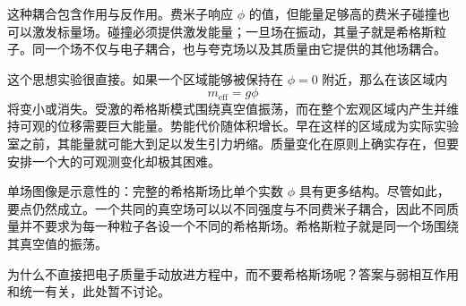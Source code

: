 这种耦合包含作用与反作用。费米子响应 \(\phi\) 的值，但能量足够高的费米子碰撞也可以激发标量场。碰撞必须提供激发能量；一旦场在振动，其量子就是希格斯粒子。同一个场不仅与电子耦合，也与夸克场以及其质量由它提供的其他场耦合。

\begin{classroomqa}
\end{classroomqa}

这个思想实验很直接。如果一个区域能够被保持在 \(\phi=0\) 附近，那么在该区域内
\begin{equation}
m_{\mathrm{eff}}=g\phi
\end{equation}
将变小或消失。受激的希格斯模式围绕真空值振荡，而在整个宏观区域内产生并维持可观的位移需要巨大能量。势能代价随体积增长。早在这样的区域成为实际实验室之前，其能量就可能大到足以发生引力坍缩。质量变化在原则上确实存在，但要安排一个大的可观测变化却极其困难。

\begin{classroomqa}
\end{classroomqa}

\begin{classroomqa}
\end{classroomqa}

单场图像是示意性的：完整的希格斯场比单个实数 \(\phi\) 具有更多结构。尽管如此，要点仍然成立。一个共同的真空场可以以不同强度与不同费米子耦合，因此不同质量并不要求为每一种粒子各设一个不同的希格斯场。希格斯粒子就是同一个场围绕其真空值的振荡。

为什么不直接把电子质量手动放进方程中，而不要希格斯场呢？答案与弱相互作用和统一有关，此处暂不讨论。

\begin{classroomqa}
\end{classroomqa}

